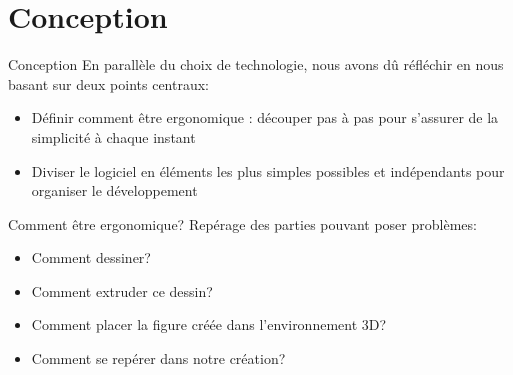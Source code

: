 \documentclass[a4paper,10pt]{beamer}
\begin{document}
	\section{Conception}	
		\begin{frame}{Conception}
	 		En parallèle du choix de technologie, nous avons dû réfléchir en nous basant sur deux points centraux:
		
			\begin{itemize}
				  \item Définir comment être ergonomique : découper pas à pas pour s'assurer de la simplicité à chaque instant
				  \item Diviser le logiciel en éléments les plus simples possibles et indépendants pour organiser le développement
			\end{itemize}
		\end{frame}
		
		
		\begin{frame}{Comment être ergonomique?}
				Repérage des parties pouvant poser problèmes:
				
				\begin{itemize}
					\item Comment dessiner?
					\item Comment extruder ce dessin?
					\item Comment placer la figure créée dans l'environnement 3D?
					\item Comment se repérer dans notre création?
				\end{itemize}
		\end{frame}	
		
\end{document}
